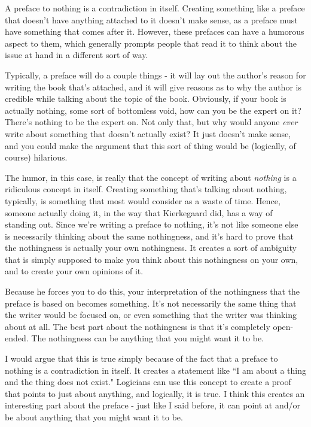 \documentclass[12pt]{article}
\begin{document}
  A preface to nothing is a contradiction in itself. Creating something like a preface that doesn't
  have anything attached to it doesn't make sense, as a preface must have something that comes after
  it. However, these prefaces can have a humorous aspect to them, which generally prompts people that
  read it to think about the issue at hand in a different sort of way.

  Typically, a preface will do a couple things - it will lay out the author's reason for writing the
  book that's attached, and it will give reasons as to why the author is credible while talking about
  the topic of the book. Obviously, if your book is actually nothing, some sort of bottomless void,
  how can you be the expert on it? There's nothing to be the expert on. Not only that, but why would
  anyone \textit{ever} write about something that doesn't actually exist? It just doesn't make sense,
  and you could make the argument that this sort of thing would be (logically, of course) hilarious.

  The humor, in this case, is really that the concept of writing about \textit{nothing} is a ridiculous
  concept in itself. Creating something that's talking about nothing, typically, is something that most
  would consider as a waste of time. Hence, someone actually doing it, in the way that Kierkegaard did,
  has a way of standing out. Since we're writing a preface to nothing, it's not like someone else is
  necessarily thinking about the same nothingness, and it's hard to prove that the nothingness is actually
  your own nothingness. It creates a sort of ambiguity that is simply supposed to make you think about
  this nothingness on your own, and to create your own opinions of it.

  Because he forces you to do this, your interpretation of the nothingness that the preface is based on
  becomes something. It's not necessarily the same thing that the writer would be focused on, or even
  something that the writer was thinking about at all. The best part about the nothingness is that it's
  completely open-ended. The nothingness can be anything that you might want it to be.

  I would argue that this is true simply because of the fact that a preface to nothing is a contradiction
  in itself. It creates a statement like ``I am about a thing and the thing does not exist." Logicians can
  use this concept to create a proof that points to just about anything, and logically, it is true. I think
  this creates an interesting part about the preface - just like I said before, it can point at and/or be
  about anything that you might want it to be.
\end{document}
